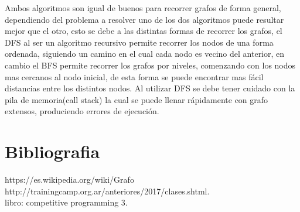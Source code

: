 \documentclass[12pt, a4paper]{article}
\begin{document}
	Ambos algoritmos son igual de buenos para recorrer grafos de forma general, dependiendo del problema a resolver
	uno de los dos algoritmos puede resultar mejor que el otro, esto se debe a las distintas formas de recorrer
	los grafos, el DFS al ser un algoritmo recursivo permite recorrer los nodos de una forma ordenada, siguiendo un
	camino en el cual cada nodo es vecino del anterior, en cambio el BFS permite recorrer los grafos por niveles, 
	comenzando con los nodos mas cercanos al nodo inicial, de esta forma se puede encontrar mas fácil distancias entre
	los distintos nodos. Al utilizar DFS se debe tener cuidado con la pila de memoria(call stack) la cual se puede
	llenar rápidamente con grafo extensos, produciendo errores de ejecución.
	
	
	\section{Bibliografia}
	https://es.wikipedia.org/wiki/Grafo\\
	http://trainingcamp.org.ar/anteriores/2017/clases.shtml.\\ 
	libro: competitive programming 3.\\ 



	
	
	
\end{document}
